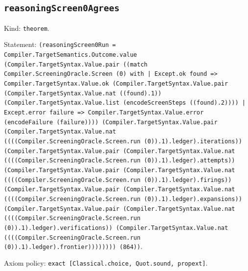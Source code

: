 \documentclass[11pt]{article}
\begin{document}
\subsection*{\texttt{reasoningScreen0Agrees}}
\noindent Kind: \texttt{theorem}.\par
\noindent Statement: \texttt{(reasoningScreen0Run = Compiler.TargetSemantics.Outcome.value (Compiler.TargetSyntax.Value.pair ((match Compiler.ScreeningOracle.Screen (0) with | Except.ok found => Compiler.TargetSyntax.Value.ok (Compiler.TargetSyntax.Value.pair (Compiler.TargetSyntax.Value.nat ((found).1)) (Compiler.TargetSyntax.Value.list (encodeScreenSteps ((found).2)))) | Except.error failure => Compiler.TargetSyntax.Value.error (encodeFailure (failure)))) (Compiler.TargetSyntax.Value.pair (Compiler.TargetSyntax.Value.nat ((((Compiler.ScreeningOracle.Screen.run (0)).1).ledger).iterations)) (Compiler.TargetSyntax.Value.pair (Compiler.TargetSyntax.Value.nat ((((Compiler.ScreeningOracle.Screen.run (0)).1).ledger).attempts)) (Compiler.TargetSyntax.Value.pair (Compiler.TargetSyntax.Value.nat ((((Compiler.ScreeningOracle.Screen.run (0)).1).ledger).firings)) (Compiler.TargetSyntax.Value.pair (Compiler.TargetSyntax.Value.nat ((((Compiler.ScreeningOracle.Screen.run (0)).1).ledger).expansions)) (Compiler.TargetSyntax.Value.pair (Compiler.TargetSyntax.Value.nat ((((Compiler.ScreeningOracle.Screen.run (0)).1).ledger).verifications)) (Compiler.TargetSyntax.Value.nat ((((Compiler.ScreeningOracle.Screen.run (0)).1).ledger).frontier)))))))) (864))}.\par
\noindent Axiom policy: \texttt{exact [Classical.choice, Quot.sound, propext]}.\par
\end{document}
